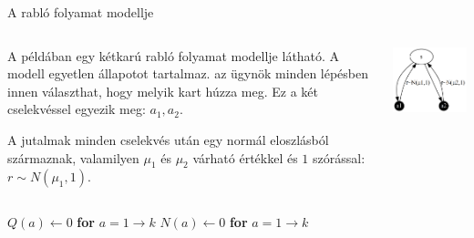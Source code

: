 \documentclass[english, aspectratio=169]{beamer}
\begin{document}
\begin{frame}{A rabló folyamat modellje}
\begin{columns}
\begin{column}{.5\textwidth}
A példában egy kétkarú rabló folyamat modellje látható. A modell egyetlen állapotot tartalmaz. az ügynök minden lépésben innen választhat, hogy melyik kart húzza meg. Ez a két cselekvéssel egyezik meg: $a_{1}, a_{2}$.\par\smallskip
A jutalmak minden cselekvés után egy normál eloszlásból származnak, valamilyen $\mu_{1}$ és $\mu_{2}$ várható értékkel és $1$ szórással: $r\sim N(\mu_{1},1)$.
\end{column}
\begin{column}{.5\textwidth}
\begin{center}
\includegraphics[width=7cm, keepaspectratio]{graphs/solving_0.png}
\end{center}
\end{column}
\end{columns}
\end{frame}

\begin{frame}
\begin{algorithm}[H]
\caption{Rabló játék}
\SetAlgoLined
	$Q(a)\leftarrow0$ \textbf{for} $a=1\rightarrow k$
	$N(a)\leftarrow	0$ \textbf{for} $a=1\rightarrow k$
\end{algorithm}
\end{frame}
\end{document}
